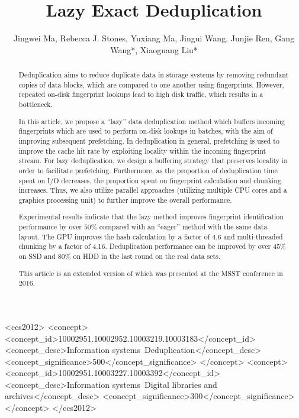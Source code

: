 \documentclass[prodmode,acmtecs]{acmsmall}
\begin{document}

\title{Lazy Exact Deduplication}
\author{Jingwei Ma, Rebecca J. Stones, Yuxiang Ma, Jingui Wang, Junjie Ren, Gang Wang*, Xiaoguang Liu*
}

\begin{abstract}
Deduplication aims to reduce duplicate data in storage systems by removing redundant copies of data blocks, which are compared to one another using fingerprints.  However, repeated on-disk fingerprint lookups lead to high disk traffic, which results in a bottleneck.

In this article, we propose a ``lazy'' data deduplication method which buffers incoming fingerprints which are used to perform on-disk lookups in batches, with the aim of improving subsequent prefetching. In deduplication in general, prefetching is used to improve the cache hit rate by exploiting locality within the incoming fingerprint stream. For lazy deduplication, we design a buffering strategy that preserves locality in order to facilitate prefetching.  Furthermore, as the proportion of deduplication time spent on I/O decreases, the proportion spent on fingerprint calculation and chunking increases.  Thus, we also utilize parallel approaches (utilizing multiple CPU cores and a graphics processing unit) to further improve the overall performance.

Experimental results indicate that the lazy method improves fingerprint identification performance by over $50\%$ compared with an ``eager'' method with the same data layout.  The GPU improves the hash calculation by a factor of 4.6 and multi-threaded chunking by a factor of 4.16. Deduplication performance can be improved by over $45\%$ on SSD and $80\%$ on HDD in the last round on the real data sets.

This article is an extended version of \cite{ma2016lazy} which was presented at the MSST conference in 2016.
\end{abstract}


%
%
\begin{CCSXML}
<ccs2012>
<concept>
<concept_id>10002951.10002952.10003219.10003183</concept_id>
<concept_desc>Information systems~Deduplication</concept_desc>
<concept_significance>500</concept_significance>
</concept>
<concept>
<concept_id>10002951.10003227.10003392</concept_id>
<concept_desc>Information systems~Digital libraries and archives</concept_desc>
<concept_significance>300</concept_significance>
</concept>
</ccs2012>
\end{CCSXML}
\end{document}
